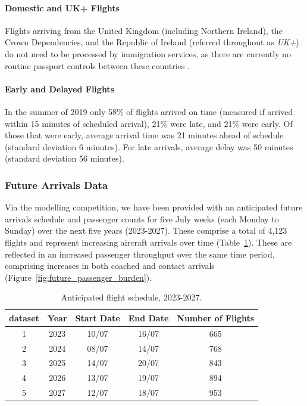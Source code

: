 \documentclass[10pt]{article}
\begin{document}
\paragraph{Domestic and UK+ Flights} Flights arriving from the United Kingdom (including Northern Ireland), the Crown Dependencies, and the Republic of Ireland (referred throughout as \textit{UK+}) do not need to be processed by immigration services, as there are currently no routine passport controls between these countries \cite{common_travel_area}.

\paragraph{Early and Delayed Flights}
In the summer of 2019 only 58\% of flights arrived on time (measured if arrived within 15 minutes of scheduled arrival), 21\% were late, and 21\% were early. Of those that were early, average arrival time was 21 minutes ahead of schedule (standard deviation 6 minutes). For late arrivals, average delay was 50 minutes (standard deviation 56 minutes).

\subsubsection{Future Arrivals Data} \label{sec:future_arrivals_data}
Via the modelling competition, we have been provided with an anticipated future arrivals schedule and passenger counts for five July weeks (each Monday to Sunday) over the next five years (2023-2027). These comprise a total of 4,123 flights and represent increasing aircraft arrivals over time (Table~\ref{tab:future_arrivals_overview}). These are reflected in an increased passenger throughput over the same time period, comprising increases in both coached and contact arrivals (Figure~\ref{fig:future_passenger_burden}).
\begin{table}[!ht]
\caption{Anticipated flight schedule, 2023-2027.}
\label{tab:future_arrivals_overview}
\centering
\begin{tabular}{ccccc}
\hline
\multicolumn{1}{c}{\textbf{dataset}} & \textbf{Year} & \textbf{Start Date} & \textbf{End Date} & \textbf{Number of Flights} \\ \hline
1  & 2023  & 10/07  & 16/07     & 665   \\
2  & 2024  & 08/07  & 14/07     & 768   \\
3  & 2025  & 14/07  & 20/07     & 843   \\
4  & 2026  & 13/07  & 19/07     & 894   \\
5  & 2027  & 12/07  & 18/07     & 953   \\ \hline
\end{tabular}
\end{table}
\end{document}
